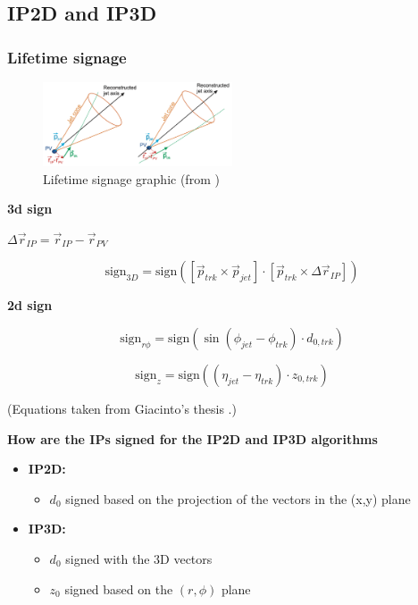 \subsection{IP2D and IP3D}

\subsubsection{Lifetime signage}

\begin{figure}[htbp]
  \centering
 \includegraphics[width=0.5\textwidth]{figures/ftag/lifetime-signage}
 \caption{Lifetime signage graphic (from \cite{giacinto-thesis})}
 \label{fig:lifetime-signage}
\end{figure}


\textbf{3d sign}


$\Delta \vec{r}_{IP} = \vec{r}_{IP}  - \vec{r}_{PV} $

\begin{equation}
  \text{sign}_{3D} =   \text{sign} \left( \left[ \vec{p}_{trk} \times \vec{p}_{jet} \right] \cdot \left[   \vec{p}_{trk} \times \Delta \vec{r}_{IP} \right] \right)
\end{equation}

\textbf{2d sign}

\begin{equation}
  \text{sign}_{r \phi} =   \text{sign} \left( \sin \left( \phi_{jet} - \phi_{trk} \right) \cdot d_{0,trk} \right)
\end{equation}

\begin{equation}
  \text{sign}_{z} =   \text{sign} \left(  \left(  \eta_{jet} - \eta_{trk} \right) \cdot z_{0,trk}  \right)
\end{equation}



(Equations taken from Giacinto's thesis  \cite{giacinto-thesis}.)

\textbf{How are the IPs signed for the IP2D and IP3D algorithms}

\begin{itemize}
	\item \textbf{IP2D: }
	\begin{itemize}
	\item$d_0$ signed based on the projection of the vectors in the (x,y) plane
	\end{itemize}

	\item \textbf{IP3D:}
	\begin{itemize}
	\item $d_0$ signed with the 3D vectors
	\item $z_0$ signed based on the $(r, \phi)$ plane
\end{itemize}
\end{itemize}


